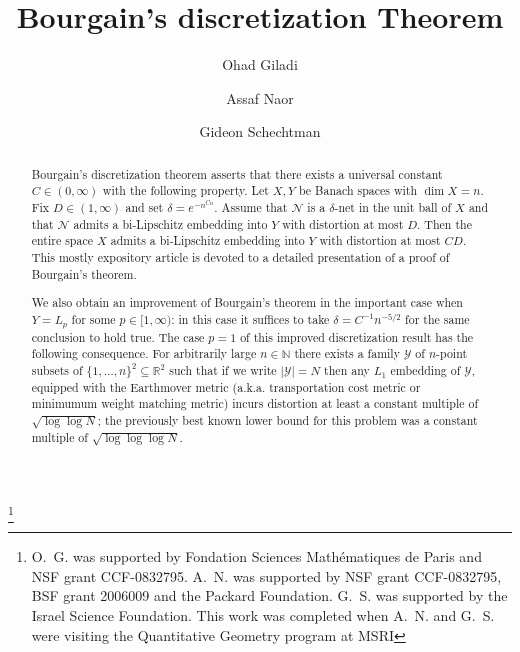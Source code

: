 \documentclass[12pt,reqno]{amsart}
\theoremstyle{plain}
\theoremstyle{definition}
\newcommand{\N}{\mathbb N}
\renewcommand{\d}{\delta}
\newcommand{\R}{\mathbb R}
\begin{document}
\title{Bourgain's discretization Theorem}\thanks{O.~G. was supported by Fondation Sciences Math\'ematiques de Paris and NSF grant CCF-0832795. A.~N.
was supported by NSF grant CCF-0832795, BSF grant
2006009 and the Packard Foundation. G.~S. was supported by the Israel Science Foundation. This work was completed when A.~N. and G.~S. were visiting the Quantitative Geometry program at MSRI}

\author{Ohad Giladi}
\address{Institut de Math\'ematiques de Jussieu, Universit\'e Paris VI}

\author{Assaf Naor}
\address{Courant Institute, New York University}

\author{Gideon Schechtman}
\address{Department of Mathematics, Weizmann Institute of Science}

\maketitle

\begin{abstract}
Bourgain's discretization theorem asserts that there exists a universal constant $C\in (0,\infty)$ with the following property. Let $X,Y$ be Banach spaces with $\dim X=n$. Fix $D\in (1,\infty)$ and set $\d= e^{-n^{Cn}}$. Assume that $\mathcal N$ is a $\d$-net in the unit ball of $X$ and that $\mathcal N$ admits a bi-Lipschitz embedding into $Y$ with distortion at most $D$. Then the entire space $X$ admits a bi-Lipschitz embedding into $Y$ with distortion at most $CD$. This mostly expository article is devoted to a detailed presentation of a proof of Bourgain's theorem.

We also obtain an improvement of Bourgain's theorem in the important case when $Y=L_p$ for some $p\in [1,\infty)$: in this case it suffices to take $\delta= C^{-1}n^{-5/2}$ for the same conclusion to hold true. The case $p=1$ of this improved discretization result has the following consequence. For arbitrarily large $n\in \N$ there exists a family $\mathscr Y$ of $n$-point subsets of $\{1,\ldots,n\}^2\subseteq \R^2$ such that if we write $|\mathscr Y|= N$ then any $L_1$ embedding of $\mathscr Y$, equipped with the  Earthmover metric (a.k.a. transportation cost metric or minimumum weight matching metric)  incurs distortion at least a constant multiple of $\sqrt{\log\log N}$; the previously best known lower bound for this problem was a constant multiple of $\sqrt{\log\log \log N}$.
\end{abstract}
\end{document}
